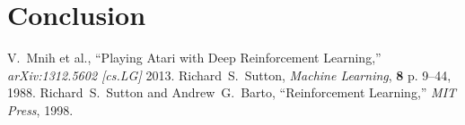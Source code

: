 \documentclass[conference]{IEEEtran}
\begin{document}
\section*{Conclusion}
 
\begin{thebibliography}{1}
V.~Mnih et al., ``Playing Atari with Deep Reinforcement Learning,'' {\em arXiv:1312.5602 [cs.LG]} 2013.
Richard~S.~Sutton, {\em Machine Learning}, {\bf 8} p. 9--44, 1988.
Richard~S.~Sutton and Andrew~G.~Barto, ``Reinforcement Learning,'' {\em MIT Press}, 1998.
\end{thebibliography}
\end{document}
